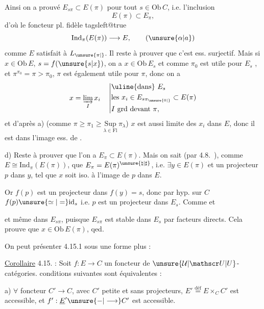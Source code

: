 Ainsi on a prouvé $E_{s\pi}\subset E(\pi)$ pour tout $s\in\mathrm{Ob}\,C$, i.e. l'inclusion
\[E(\pi)\subset E_\pi,\]
d'où le foncteur pl. fidèle
{\csname tagsleft@true\endcsname
\[\mathrm{Ind}_\pi(E(\pi))\longrightarrow E,\tag*{$(\unsure{\alpha|a})$}\]}
comme $E$ satisfait à $L_{\unsure{\pi|{}}}$. Il reste à prouver que c'est ess. surjectif. Mais si $x\in\mathrm{Ob}\,E$, $s=f(\unsure{s|x})$, on a $x\in\mathrm{Ob}\,E_s$ et comme $\pi_0$ est utile pour $E_s$  , et $\pi^{\pi_0}=\pi>\pi_0$, $\pi$ est également utile pour $\pi$, donc on a
\[x=\varinjlim_I x_i\quad\left|\begin{aligned}&\text{\uline{dans} }E_s\\&\text{les }x_i\in E_{s\pi_{\unsure{0|{}}}}\subset E(\pi)\\&I\ \text{grd devant }\pi,\end{aligned}\right.\]
et d'après a) (comme $\pi\geq\pi_1\geq\underset{\lambda\in\mathrm{Fl}}{\mathrm{Sup}}\,\pi_\lambda$) $x$ est aussi limite des $x_i$ dans $E$, donc il est dans  l'image ess. de .

d) Reste à prouver que l'on a $E_\pi\subset E(\pi)$. Mais on sait (par 4.8.\ ),  comme $E\cong\mathrm{Ind}_\pi(E(\pi))$, que $E_\pi=E(\pi)^{\unsure{\natural|\sharp}}$, i.e.  $\exists y\in E(\pi)$ et un projecteur $p$ dans $y$, tel que $x$ soit iso. à l'image de $p$ dans $E$.

Or $f(p)$ est un projecteur dans $f(y)=s$, donc par hyp. sur $C$ $f(p)\unsure{\simeq|=}\mathrm{id}_s$ i.e. $p$ est un projecteur dans $E_s$. Comme   et

et même dans $E_{s\pi}$, puisque $E_{s\pi}$ est stable dans $E_s$ par facteurs directs. Cela prouve que $x\in\mathrm{Ob}\,E(\pi)$, qed.

On peut présenter 4.15.1 sous une forme plus  :

\uline{Corollaire} 4.15. : Soit $f:E\longrightarrow C$ un foncteur de $\unsure{\mathcal U|\mathscr U|U}$-catégories.  conditions suivantes sont équivalentes :

a) $\forall$ foncteur $C'\longrightarrow C$, avec $C'$ petite et sans projecteurs, $E'\overset{\mathrm{déf}}{=}E\times_C C'$ est accessible, et $f':\underline E'\unsure{\mathord{-}|\longrightarrow}C'$ est accessible.


